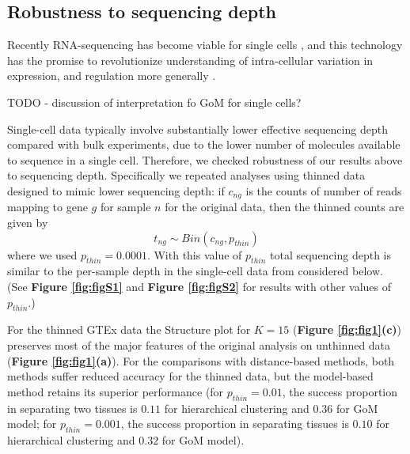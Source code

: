 \subsection{Robustness to sequencing depth}

Recently RNA-sequencing has become viable for single cells \cite{findref}, and this technology has the promise to revolutionize understanding of intra-cellular variation in expression, and regulation more generally \cite{trapnell_review}. 

TODO - discussion of interpretation fo GoM for single cells?

Single-cell data typically involve substantially lower effective sequencing depth compared with bulk experiments, due to the lower number of molecules available to sequence in a single cell.
Therefore, we checked robustness of our results above to sequencing depth. Specifically we repeated analyses using thinned data designed to mimic lower sequencing depth: if $c_{ng}$ is the counts of number of reads mapping to gene $g$ for sample $n$ for the original data, then the thinned counts are given by 
\begin{equation}
t_{ng} \sim Bin (c_{ng}, p_{thin})
\end{equation}
where we used $p_{thin} =0.0001$. With this value of $p_{thin}$ total sequencing depth is similar to the per-sample depth in the 
single-cell data from \cite{Jaitin2014} considered below. (See  \textbf{Figure \ref{fig:figS1}} and \textbf{Figure \ref{fig:figS2}} for results with other values of $p_{thin}$.) 

For the thinned GTEx data the Structure plot for $K=15$ (\textbf{Figure \ref{fig:fig1}(c)}) preserves most of the major features of the original analysis on unthinned data (\textbf{Figure \ref{fig:fig1}(a)}). For the comparisons with distance-based methods, both methods suffer reduced accuracy for the thinned data, but the model-based method retains its superior performance (for $p_{thin}=0.01$, the success proportion in separating two tissues is $0.11$  for hierarchical clustering and $0.36$ for GoM model; for $p_{thin}=0.001$, the success proportion in separating tissues is  $0.10$ for hierarchical clustering and $0.32$ for GoM model).  



